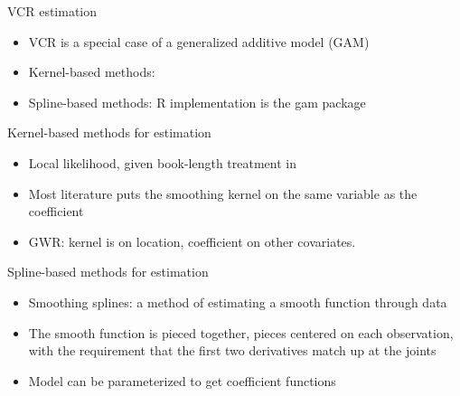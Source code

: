 \documentclass{beamer}
\begin{document}
                    
    
    \begin{frame}{VCR estimation}
        \begin{itemize}
            \item VCR is a special case of a generalized additive model (GAM) \citep{Hastie:1986, Hastie:1990}
            \item Kernel-based methods: \cite{Hastie:1993b, Loader:1999}
            \item Spline-based methods: R implementation is the gam package \citep{Wood:2006} 
        \end{itemize}
    \end{frame}


    \begin{frame}{Kernel-based methods for estimation}
        \begin{itemize}
            \item Local likelihood, given book-length treatment in \cite{Loader:1999}
            \item Most literature puts the smoothing kernel on the same variable as the coefficient
            \item GWR: kernel is on location, coefficient on other covariates.
        \end{itemize}
    \end{frame}
	 

    \begin{frame}{Spline-based methods for estimation}
        \begin{itemize}
            \item Smoothing splines: a method of estimating a smooth function through data \citep{Wahba:1990}
            \item The smooth function is pieced together, pieces centered on each observation, with the requirement that the first two derivatives match up at the joints
            \item Model can be parameterized to get coefficient functions \citep{Hastie:1993a}
        \end{itemize}
    \end{frame}
    
    
\end{document}
